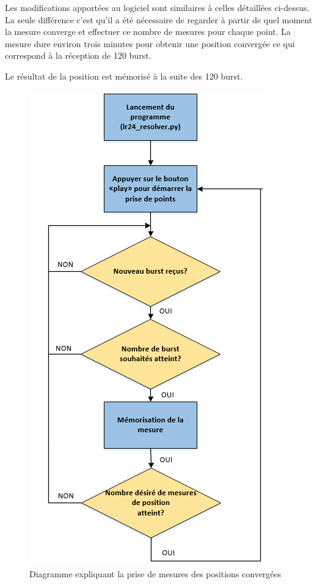 Les modifications apportées au logiciel sont similaires à celles détaillées ci-dessus. La seule différence c'est qu'il a été nécessaire de regarder à partir de quel moment la mesure converge et effectuer ce nombre de mesures pour chaque point. La mesure dure environ trois minutes pour obtenir une position convergée ce qui correspond à la réception de 120 burst. 

Le résultat de la position est mémorisé à la suite des 120 burst. 

\begin{figure}[htp]
 \begin{center}
  \includegraphics[scale=0.7]{figures/PriseMesures2.png}
  \caption{Diagramme expliquant la prise de mesures des positions convergées}
  \label{fig:mesures2} %
 \end{center}
\end{figure}

